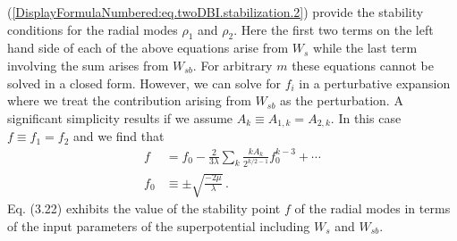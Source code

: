 \documentclass[a4paper,11pt]{article}
\begin{document}
  (\ref{DisplayFormulaNumbered:eq.twoDBI.stabilization.2})    
  provide the stability conditions  for the radial modes $\rho_1$ and $\rho_2$. 
  Here the first two terms on the left hand side of each of the above equations arise from $W_s$ while the last term involving
  the sum arises from $W_{sb}$. 
  For arbitrary $m$ these equations cannot be solved in a closed form. However, we can solve for $f_i$ in a perturbative
  expansion where we treat the contribution arising from $W_{sb}$ as the perturbation. A significant simplicity results if we
  assume $A_k\equiv A_{1,k}=A_{2,k}$. In this case $f\equiv f_1=f_2$ and   we find that 
    \begin{align} \label{eq.f.series}
  f&= f_0 - \frac{2}{3\lambda} \sum_{k} \frac{kA_k}{2^{k/2-1} } f_0^{k-3} + \cdots  \nonumber\\
  f_0&\equiv \pm \sqrt{\frac{-2\mu}{\lambda}}\,.
  \end{align}
  Eq. (3.22) exhibits the value of the stability point  $f$ of the radial modes in terms of the input parameters of the superpotential
  including $W_s$ and $W_{sb}$. 
  
\end{document}
